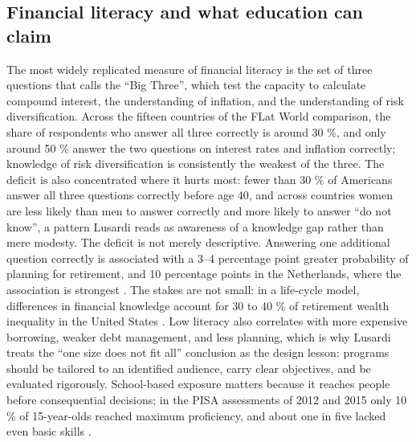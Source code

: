\subsection{Financial literacy and what education can claim}

The most widely replicated measure of financial literacy is the set of three
questions that \textcite{lusardi2019financial} calls the \enquote{Big Three},
which test the capacity to calculate compound interest, the understanding of
inflation, and the understanding of risk diversification. Across the fifteen
countries of the FLat World comparison, the share of respondents who answer
all three correctly is around 30 \%, and only around 50 \% answer the two
questions on interest rates and inflation correctly; knowledge of risk
diversification is consistently the weakest of the three. The deficit is also
concentrated where it hurts most: fewer than 30 \% of Americans answer all
three questions correctly before age 40, and across countries women are less
likely than men to answer correctly and more likely to answer \enquote{do not
know}, a pattern Lusardi reads as awareness of a knowledge gap rather than
mere modesty. The deficit is not merely descriptive. Answering one additional question correctly is associated
with a 3--4 percentage point greater probability of planning for retirement,
and 10 percentage points in the Netherlands, where the association is
strongest \parencite{lusardi2019financial}. The stakes are not small: in a
life-cycle model, differences in financial knowledge account for 30 to 40 \%
of retirement wealth inequality in the United States
\parencite{lusardi2019financial}. Low literacy also correlates with
more expensive borrowing, weaker debt management, and less planning, which is
why Lusardi treats the \enquote{one size does not fit all} conclusion as the
design lesson: programs should be tailored to an identified audience, carry
clear objectives, and be evaluated rigorously. School-based exposure matters
because it reaches people before consequential decisions; in the PISA
assessments of 2012 and 2015 only 10 \% of 15-year-olds reached maximum
proficiency, and about one in five lacked even basic skills
\parencite{lusardi2019financial}.

